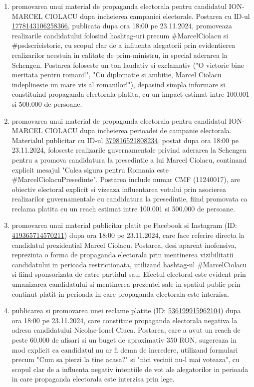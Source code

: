 \documentclass[a4paper,12pt]{article}
\begin{document}
\begin{enumerate}[leftmargin=*, label=\arabic*.)]
    \item promovarea unui material de propaganda electorala pentru candidatul ION-MARCEL CIOLACU dupa incheierea campaniei electorale. Postarea cu ID-ul \href{https://www.facebook.com/ads/library/?id=1778143106258366}{1778143106258366}, publicata dupa ora 18:00 pe 23.11.2024, promoveaza realizarile candidatului folosind hashtag-uri precum \#MarcelCiolacu si \#psdscrieistorie, cu scopul clar de a influenta alegatorii prin evidentierea realizarilor acestuia in calitate de prim-ministru, in special aderarea la Schengen. Postarea foloseste un ton laudativ si exclamativ ("O victorie bine meritata pentru romani!", "Cu diplomatie si ambitie, Marcel Ciolacu indeplineste un mare vis al romanilor!"), depasind simpla informare si constituind propaganda electorala platita, cu un impact estimat intre 100.001 si 500.000 de persoane.
    \item promovarea unui material de propaganda electorala pentru candidatul ION-MARCEL CIOLACU dupa incheierea perioadei de campanie electorala. Materialul publicitar cu ID-ul \href{https://www.facebook.com/ads/library/?id=379816521808234}{379816521808234}, postat dupa ora 18:00 pe 23.11.2024, foloseste realizarile guvernamentale privind aderarea la Schengen pentru a promova candidatura la presedintie a lui Marcel Ciolacu, continand explicit mesajul "Calea sigura pentru Romania este \#MarcelCiolacuPresedinte". Postarea include numar CMF (11240017), are obiectiv electoral explicit si vizeaza influentarea votului prin asocierea realizarilor guvernamentale cu candidatura la presedintie, fiind promovata ca reclama platita cu un reach estimat intre 100.001 si 500.000 de persoane.
    \item promovarea unui material publicitar platit pe Facebook si Instagram (ID: \href{https://www.facebook.com/ads/library/?id=419365714570211}{419365714570211}) dupa ora 18:00 pe 23.11.2024, care face referire directa la candidatul prezidential Marcel Ciolacu. Postarea, desi aparent inofensiva, reprezinta o forma de propaganda electorala prin mentinerea vizibilitatii candidatului in perioada restrictionata, utilizand hashtag-ul \#MarcelCiolacu si fiind sponsorizata de catre partidul sau. Efectul electoral este evident prin umanizarea candidatului si mentinerea prezentei sale in spatiul public prin continut platit in perioada in care propaganda electorala este interzisa.
    \item publicarea si promovarea unei reclame platite (ID: \href{https://www.facebook.com/ads/library/?id=536199915962104}{536199915962104}) dupa ora 18:00 pe 23.11.2024, care constituie propaganda electorala negativa la adresa candidatului Nicolae-Ionel Ciuca. Postarea, care a avut un reach de peste 60.000 de afisari si un buget de aproximativ 350 RON, sugereaza in mod explicit ca candidatul nu ar fi demn de incredere, utilizand formulari precum "Cum sa pierzi la tine acasa?" si "nici vecinii nu-l mai voteaza", cu scopul clar de a influenta negativ intentiile de vot ale alegatorilor in perioada in care propaganda electorala este interzisa prin lege.

\end{enumerate}
\end{document}
